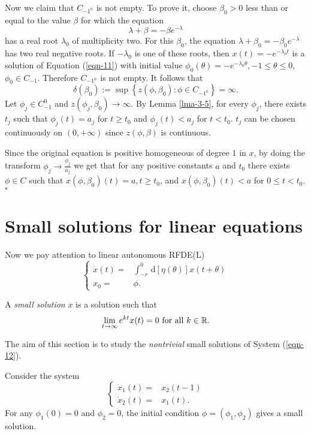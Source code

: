 Now we claim that $C_{-1^{n}}$ is not empty. To prove it, choose $\beta_0>0$ less than or equal to the value $\beta$ for which the equation
\[
\lambda+\beta=-\beta e^{-\lambda}
\] 
has a real root $\lambda_0$ of multiplicity two. For this $\beta_0$, the equation $\lambda+\beta_0=-\beta_0 e^{-\lambda}$ has two real negative roots. If $-\lambda_0$ is one of these roots, then $x(t)=-e^{-\lambda_0t}$ is a solution of Equation (\ref{eqn-11}) with initial value $\phi_0(\theta)=-e^{-\lambda_0 \theta},-1\le \theta\le 0$, $\phi_0 \in C_{-1}$. Therefore $C_{-1^{n}}$ is not empty. It follows that 
\[
  \delta(\beta_0):=\sup \left\{z(\phi,\beta_0):\phi \in C_{-1^{0}}\right\} =\infty.
\] 
Let $\phi_j \in  C_{-1}^{0}$ and $z(\phi_j,\beta_0)\to \infty$. By Lemma \ref{lma-3-5}, for every $\phi_j$, there exists $t_j$ such that $\phi_j(t)=a_j$ for $t\ge t_0$ and $\phi_j(t)<a_j$ for $t<t_0$. $t_j$ can be chosen continuously on $(0,+\infty)$ since $z(\phi,\beta)$ is continuous.


Since the original equation is positive homogeneous of degree $1$ in $x$, by doing the transform $\phi_j\to \frac{\phi_j}{a_j}$ we get that for any positive constants $a$ and $t_0$ there exists $\phi \in  C$ such that 
$x(\phi,\beta_0)(t)=a,t\ge t_0$, and $x(\phi,\beta_0)(t)<a$ for $0\le t<t_0$.\hfill $\square$ \par

\section{Small solutions for linear equations}
Now we pay attention to linear autonomous RFDE(L)
\begin{equation}\label{eqn-12}
 \left\{ \begin{aligned}
     \dot{x}(t)=& \int_{-r}^{0}\, \mathrm{d}[\eta(\theta)]x(t+\theta)\\
     x_0=& \phi.
  \end{aligned}\right.
\end{equation}
\begin{definition}
  A \textit{small solution } $x$ is a solution such that 
  \begin{equation}
    \lim_{t\to \infty}e^{kt}x(t)=0 \text{ for all } k \in \mathbb{R}.
  \end{equation}
\end{definition}
The aim of this section is to study the \textit{nontrivial} small solutions of System (\ref{eqn-12}).
\begin{example}
  Consider the system
  \begin{equation}
    \left\{
      \begin{aligned}
	\dot{x}_1(t)=&x_2(t-1)\\
	\dot{x}_2(t)=&x_1(t).
      \end{aligned}
      \right.
  \end{equation}
  For any $\phi_1(0)=0$ and $\phi_2=0$, the initial condition $\phi=(\phi_1,\phi_2)$ gives a small solution.
\end{example}

